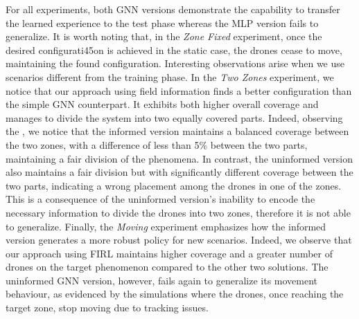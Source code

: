 For all experiments, both \ac{GNN} versions demonstrate the capability to transfer the learned experience to the test phase whereas the MLP version fails to generalize. 
%
It is worth noting that, in the \emph{Zone Fixed} experiment, %
 once the desired configurati45on is achieved in the static case, 
 the drones cease to move, maintaining the found configuration.
%
Interesting observations arise when we use scenarios different from the training phase. 
In the \emph{Two Zones} experiment,
 we notice that our approach using field information finds a better configuration than the simple GNN counterpart. 
%
It exhibits both higher overall coverage and manages to divide the system into two equally covered parts. 
%
Indeed, observing the , we notice that the informed version maintains a balanced coverage between the two zones, 
 with a difference of less than 5\% between the two parts, maintaining a fair division of the phenomena.
%
In contrast, the uninformed version also maintains a fair division but with significantly different coverage between the two parts, 
 indicating a wrong placement among the drones in one of the zones.
%
This is a consequence of the uninformed version's inability to encode the necessary information to divide the drones into two zones, therefore it is not able to generalize.
%
Finally, the \emph{Moving} experiment emphasizes how the informed version generates a more robust policy for new scenarios. 
 Indeed, we observe that our approach using \ac{FIRL} maintains higher coverage and a greater number of drones on the target phenomenon compared to the other two solutions.
%
The uninformed GNN version, however, 
 fails again to generalize its movement behaviour, as evidenced by the simulations where the drones, once reaching the target zone, stop moving due to tracking issues.

